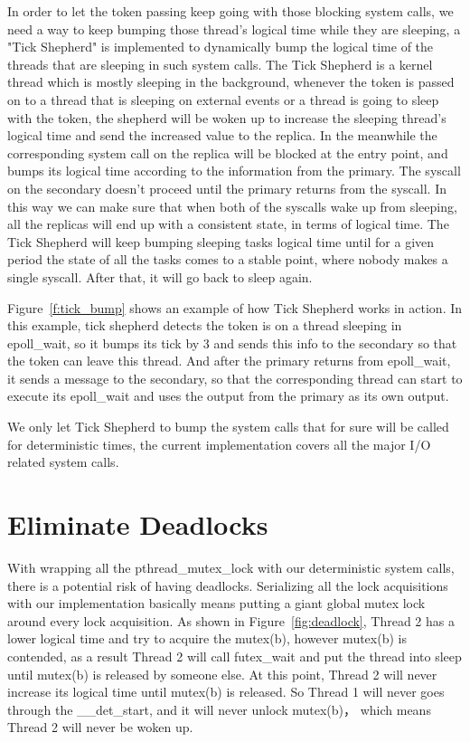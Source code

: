 In order to let the token passing keep going with those blocking system calls, we need a way to keep bumping those thread's logical time while they are sleeping, a "Tick Shepherd" is implemented to dynamically bump the logical time of the threads that are sleeping in such system calls. The Tick Shepherd is a kernel thread which is mostly sleeping in the background, whenever the token is passed on to a thread that is sleeping on external events or a thread is going to sleep with the token, the shepherd will be woken up to increase the sleeping thread's logical time and send the increased value to the replica. In the meanwhile the corresponding system call on the replica will be blocked at the entry point, and bumps its logical time according to the information from the primary. The syscall on the secondary doesn't proceed until the primary returns from the syscall. In this way we can make sure that when both of the syscalls wake up from sleeping, all the replicas will end up with a consistent state, in terms of logical time. The Tick Shepherd will keep bumping sleeping tasks logical time until for a given period the state of all the tasks comes to a stable point, where nobody makes a single syscall. After that, it will go back to sleep again.


Figure~\ref{f:tick_bump} shows an example of how Tick Shepherd works in action. In this example, tick shepherd detects the token is on a thread sleeping in epoll\_wait, so it bumps its tick by 3 and sends this info to the secondary so that the token can leave this thread. And after the primary returns from epoll\_wait, it sends a message to the secondary, so that the corresponding thread can start to execute its epoll\_wait and uses the output from the primary as its own output.


We only let Tick Shepherd to bump the system calls that for sure will be called for deterministic times, the current implementation covers all the major I/O related system calls.

\section{Eliminate Deadlocks} \label{sec:edeadlock}
With wrapping all the pthread\_mutex\_lock with our deterministic system calls, there is a potential risk of having deadlocks. Serializing all the lock acquisitions with our implementation basically means putting a giant global mutex lock around every lock acquisition. As shown in Figure~\ref{fig:deadlock}, Thread 2 has a lower logical time and try to acquire the mutex(b), however mutex(b) is contended, as a result Thread 2 will call futex\_wait and put the thread into sleep until mutex(b) is released by someone else. At this point, Thread 2 will never increase its logical time until mutex(b) is released. So Thread 1 will never goes through the \_\_det\_start, and it will never unlock mutex(b)， which means Thread 2 will never be woken up.

